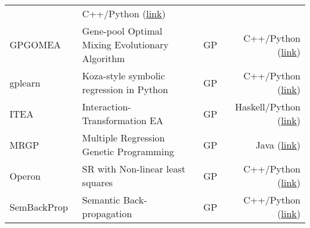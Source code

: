 \begin{table}
\begin{tabular}{l L{12em} L{8em} r}
                    &   C++/Python (\href{https://github.com/natekupp/ffx/tree/master/ffx}{link})                  \\
        GPGOMEA~\cite{virgolin2020improving}     &   Gene-pool Optimal Mixing Evolutionary Algorithm     & GP            
                    &   C++/Python (\href{https://github.com/marcovirgolin/GP-GOMEA/}{link})                  \\
        gplearn     &   Koza-style symbolic regression in Python       &   GP                          
                    &   C++/Python (\href{https://github.com/trevorstephens/gplearn}{link})                  \\
        ITEA~\cite{defrancaInteractionTransformationEvolutionaryAlgorithm2020}   &   Interaction-Transformation EA       &   GP
                    &   Haskell/Python (\href{https://github.com/folivetti/ITEA/}{link})              \\
        MRGP~\cite{arnaldoMultipleRegressionGenetic2014a}                        &   Multiple Regression Genetic Programming &   GP
                    &   Java (\href{https://github.com/flexgp/gp-learners}{link})                        \\
        Operon~\cite{kommendaParameterIdentificationSymbolic2019}                &   SR with Non-linear least squares     &   GP
                    &   C++/Python (\href{https://github.com/heal-research/operon}{link})                  \\
        SemBackProp~\cite{virgolinLinearScalingSemantic2019}                     &   Semantic Back-propagation           &   GP
                    &   C++/Python (\href{https://github.com/marcovirgolin/GP-GOMEA}{link})                  \\ 
        \bottomrule
    \end{tabular}
\end{table}

